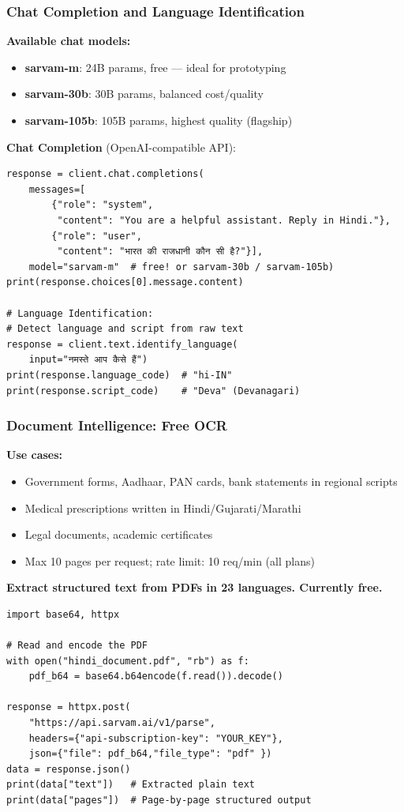 \begin{frame}[fragile]\frametitle{Chat Completion and Language Identification}
\textbf{Available chat models:}
\begin{itemize}
  \item \textbf{sarvam-m}: 24B params, free --- ideal for prototyping
  \item \textbf{sarvam-30b}: 30B params, balanced cost/quality
  \item \textbf{sarvam-105b}: 105B params, highest quality (flagship)
\end{itemize}

\textbf{Chat Completion} (OpenAI-compatible API):
\begin{lstlisting}
response = client.chat.completions(
    messages=[
        {"role": "system",
         "content": "You are a helpful assistant. Reply in Hindi."},
        {"role": "user",
         "content": "भारत की राजधानी कौन सी है?"}],
    model="sarvam-m"  # free! or sarvam-30b / sarvam-105b)
print(response.choices[0].message.content)

# Language Identification:
# Detect language and script from raw text
response = client.text.identify_language(
    input="नमस्ते आप कैसे हैं")
print(response.language_code)  # "hi-IN"
print(response.script_code)    # "Deva" (Devanagari)
\end{lstlisting}

\end{frame}

\begin{frame}[fragile]\frametitle{Document Intelligence: Free OCR}

\textbf{Use cases:}
  \begin{itemize}
    \item Government forms, Aadhaar, PAN cards, bank statements in regional scripts
    \item Medical prescriptions written in Hindi/Gujarati/Marathi
    \item Legal documents, academic certificates
    \item Max 10 pages per request; rate limit: 10 req/min (all plans)
  \end{itemize}
  
\textbf{Extract structured text from PDFs in 23 languages. Currently free.}
\begin{lstlisting}
import base64, httpx

# Read and encode the PDF
with open("hindi_document.pdf", "rb") as f:
    pdf_b64 = base64.b64encode(f.read()).decode()

response = httpx.post(
    "https://api.sarvam.ai/v1/parse",
    headers={"api-subscription-key": "YOUR_KEY"},
    json={"file": pdf_b64,"file_type": "pdf" })
data = response.json()
print(data["text"])   # Extracted plain text
print(data["pages"])  # Page-by-page structured output
\end{lstlisting}


\end{frame}


